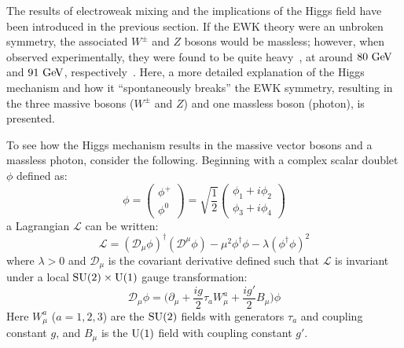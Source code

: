 ﻿%

The results of electroweak mixing and the implications of the Higgs field have been introduced in the previous section.
If the EWK theory were an unbroken symmetry, the associated $W^{\pm}$ and $Z$ bosons would be massless; however, when observed experimentally, they were found to be quite heavy~\cite{1983.w-boson, 1983.z-boson}, at around $80\gev$ and $91\gev$, respectively~\cite{2014.pdg}.
Here, a more detailed explanation of the Higgs mechanism and how it ``spontaneously breaks'' the EWK symmetry, resulting in the three massive bosons ($W^\pm$ and $Z$) and one massless boson (photon), is presented.

To see how the Higgs mechanism results in the massive vector bosons and a massless photon, consider the following.
Beginning with a complex scalar doublet $\phi$ defined as:
\begin{equation}
  \phi = 
  \begin{pmatrix}
    \phi^{+} \\
    \phi^{0}
  \end{pmatrix}
  = \sqrt{\frac{1}{2}}
  \begin{pmatrix}
    \phi_1 + i\phi_2 \\
    \phi_3 + i\phi_4
  \end{pmatrix}
  \label{eq:complex_scalar_doublet}
\end{equation}
a Lagrangian $\mathcal{L}$ can be written:
\begin{equation}
  \mathcal{L} = (\mathcal{D}_\mu\phi)^\dagger (\mathcal{D}^\mu\phi) - \mu^2\phi^{\dagger}\phi-\lambda (\phi^{\dagger}\phi)^2
  \label{eq:complex_scalar_lagrangian}
\end{equation}
where $\lambda > 0$ and $\mathcal{D}_{\mu}$ is the covariant derivative defined such that $\mathcal{L}$ is invariant under a local $\textrm{SU}(2)\times\textrm{U}(1)$ gauge transformation:
\begin{equation}
  \mathcal{D}_{\mu}\phi = \bigg(\partial_{\mu} + \frac{ig}{2}\tau_a W_{\mu}^a + \frac{ig'}{2}B_{\mu}\bigg)\phi
  \label{eq:covariant_deriv}
\end{equation}
Here $W_{\mu}^a$ ($a=1,2,3$) are the $\textrm{SU}(2)$ fields with generators $\tau_a$ and coupling constant $g$, and $B_{\mu}$ is the $\textrm{U}(1)$ field with coupling constant $g'$.

